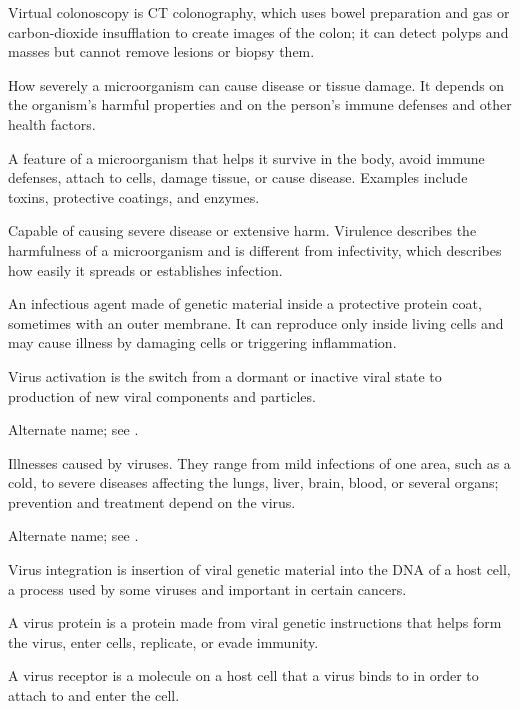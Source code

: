  Virtual colonoscopy is CT colonography, which uses bowel preparation and gas or carbon-dioxide insufflation to create images of the colon; it can detect polyps and masses but cannot remove lesions or biopsy them.

 How severely a microorganism can cause disease or tissue damage. It depends on the organism’s harmful properties and on the person’s immune defenses and other health factors.

 A feature of a microorganism that helps it survive in the body, avoid immune defenses, attach to cells, damage tissue, or cause disease. Examples include toxins, protective coatings, and enzymes.

 Capable of causing severe disease or extensive harm. Virulence describes the harmfulness of a microorganism and is different from infectivity, which describes how easily it spreads or establishes infection.

 An infectious agent made of genetic material inside a protective protein coat, sometimes with an outer membrane. It can reproduce only inside living cells and may cause illness by damaging cells or triggering inflammation.

 Virus activation is the switch from a dormant or inactive viral state to production of new viral components and particles.

 Alternate name; see .

 Illnesses caused by viruses. They range from mild infections of one area, such as a cold, to severe diseases affecting the lungs, liver, brain, blood, or several organs; prevention and treatment depend on the virus.

 Alternate name; see .

 Virus integration is insertion of viral genetic material into the DNA of a host cell, a process used by some viruses and important in certain cancers.

 A virus protein is a protein made from viral genetic instructions that helps form the virus, enter cells, replicate, or evade immunity.

 A virus receptor is a molecule on a host cell that a virus binds to in order to attach to and enter the cell.

